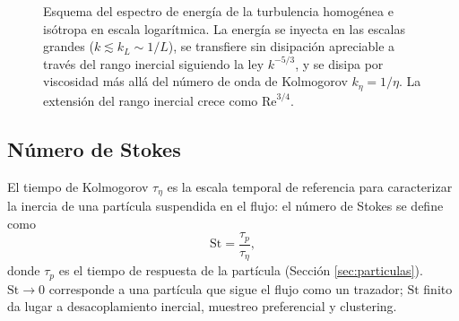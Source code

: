 \documentclass[11pt]{article}
\begin{document}
\begin{figure}[htbp]
  \centering
  \caption{Esquema del espectro de energía de la turbulencia homogénea e
  isótropa en escala logarítmica. La energía se inyecta en las escalas
  grandes ($k \lesssim k_L \sim 1/L$), se transfiere sin disipación
  apreciable a través del rango inercial siguiendo la ley $k^{-5/3}$, y se
  disipa por viscosidad más allá del número de onda de Kolmogorov
  $k_\eta = 1/\eta$. La extensión del rango inercial crece como
  $\mathrm{Re}^{3/4}$.}
  \label{fig:espectro}
\end{figure}

\subsection{Número de Stokes}

El tiempo de Kolmogorov $\tau_\eta$ es la escala temporal de referencia
para caracterizar la inercia de una partícula suspendida en el flujo: el
número de Stokes se define como
\begin{equation}
  \mathrm{St} = \frac{\tau_p}{\tau_\eta},
\end{equation}
donde $\tau_p$ es el tiempo de respuesta de la partícula (Sección
\ref{sec:particulas}). $\mathrm{St}\to 0$ corresponde a una partícula que
sigue el flujo como un trazador; $\mathrm{St}$ finito da lugar a
desacoplamiento inercial, muestreo preferencial y clustering.
\end{document}
